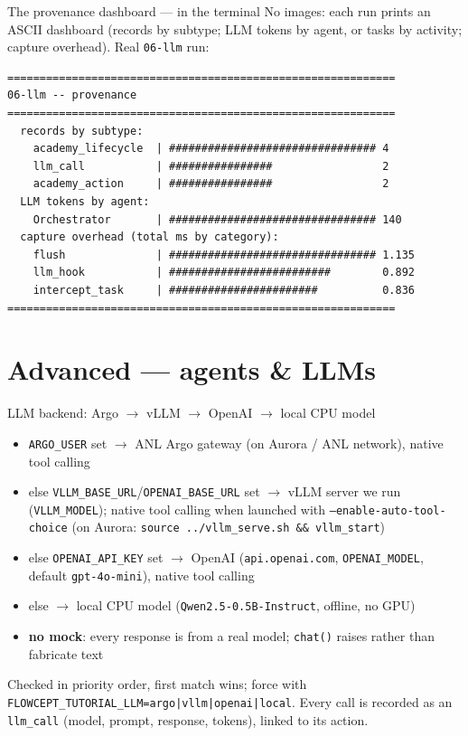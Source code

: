 \documentclass[aspectratio=169,11pt]{beamer}
\begin{document}
\begin{frame}[fragile]{The provenance dashboard --- in the terminal}
  No images: each run prints an ASCII dashboard (records by subtype; LLM tokens by
  agent, or tasks by activity; capture overhead). \small Real \texttt{06-llm} run:
\begin{lstlisting}[style=sh]
============================================================
06-llm -- provenance
============================================================
  records by subtype:
    academy_lifecycle  | ################################ 4
    llm_call           | ################                 2
    academy_action     | ################                 2
  LLM tokens by agent:
    Orchestrator       | ################################ 140
  capture overhead (total ms by category):
    flush              | ################################ 1.135
    llm_hook           | #########################        0.892
    intercept_task     | #######################          0.836
============================================================
\end{lstlisting}
\end{frame}

\section{Advanced --- agents \& LLMs}

\begin{frame}{LLM backend: Argo $\to$ vLLM $\to$ OpenAI $\to$ local CPU model}
  \begin{itemize}\small
    \item \texttt{ARGO\_USER} set $\to$ \alert{ANL Argo gateway} (on Aurora / ANL network), native tool calling
    \item else \texttt{VLLM\_BASE\_URL}/\texttt{OPENAI\_BASE\_URL} set $\to$ \alert{vLLM}
      server we run (\texttt{VLLM\_MODEL}); native tool calling when launched with
      \texttt{--enable-auto-tool-choice} (on Aurora: \texttt{source ../vllm\_serve.sh \&\& vllm\_start})
    \item else \texttt{OPENAI\_API\_KEY} set $\to$ \alert{OpenAI}
      (\texttt{api.openai.com}, \texttt{OPENAI\_MODEL}, default \texttt{gpt-4o-mini}), native tool calling
    \item else $\to$ \alert{local CPU model}
      (\texttt{Qwen2.5-0.5B-Instruct}, offline, no GPU)
    \item \textbf{no mock}: every response is from a real model; \texttt{chat()}
      raises rather than fabricate text
  \end{itemize}
  \small Checked in priority order, first match wins; force with
  \texttt{FLOWCEPT\_TUTORIAL\_LLM=argo|vllm|openai|local}. Every call is recorded as an
  \texttt{llm\_call} (model, prompt, response, tokens), linked to its action.
\end{frame}
\end{document}

